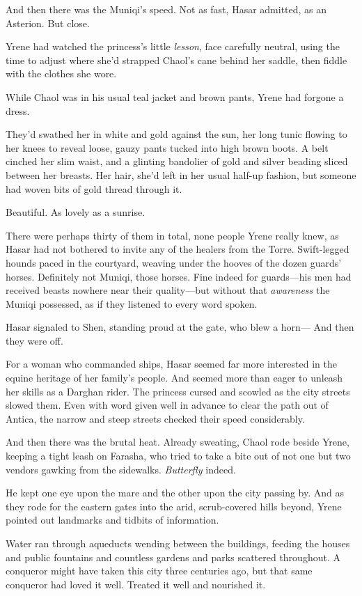 And then there was the Muniqi's speed. Not as fast, Hasar admitted, as an Asterion. But close.

Yrene had watched the princess's little \emph{lesson}, face carefully neutral, using the time to adjust where she'd strapped Chaol's cane behind her saddle, then fiddle with the clothes she wore.

While Chaol was in his usual teal jacket and brown pants, Yrene had forgone a dress.

They'd swathed her in white and gold against the sun, her long tunic flowing to her knees to reveal loose, gauzy pants tucked into high brown boots. A belt cinched her slim waist, and a glinting bandolier of gold and silver beading sliced between her breasts. Her hair, she'd left in her usual half-up fashion, but someone had woven bits of gold thread through it.

Beautiful. As lovely as a sunrise.

There were perhaps thirty of them in total, none people Yrene really knew, as Hasar had not bothered to invite any of the healers from the Torre. Swift-legged hounds paced in the courtyard, weaving under the hooves of the dozen guards' horses. Definitely not Muniqi, those horses. Fine indeed for guards---his men had received beasts nowhere near their quality---but without that \emph{awareness} the Muniqi possessed, as if they listened to every word spoken.

Hasar signaled to Shen, standing proud at the gate, who blew a horn--- And then they were off.

For a woman who commanded ships, Hasar seemed far more interested in the equine heritage of her family's people. And seemed more than eager to unleash her skills as a Darghan rider. The princess cursed and scowled as the city streets slowed them. Even with word given well in advance to clear the path out of Antica, the narrow and steep streets checked their speed considerably.

And then there was the brutal heat. Already sweating, Chaol rode beside Yrene, keeping a tight leash on Farasha, who tried to take a bite out of not one but two vendors gawking from the sidewalks. \emph{Butterfly}
indeed.

He kept one eye upon the mare and the other upon the city passing by. And as they rode for the eastern gates into the arid, scrub-covered hills beyond, Yrene pointed out landmarks and tidbits of information.

Water ran through aqueducts wending between the buildings, feeding the houses and public fountains and countless gardens and parks scattered throughout. A conqueror might have taken this city three centuries ago, but that same conqueror had loved it well. Treated it well and nourished it.


